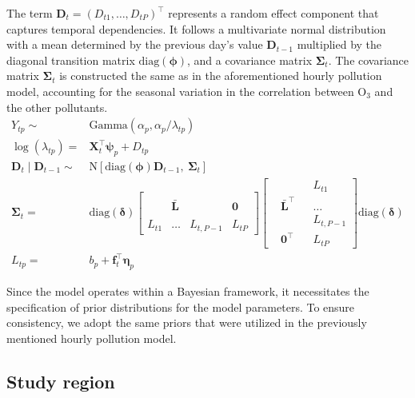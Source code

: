 \documentclass[
  12,
]{article}
\begin{document}
The term \(\symbf{D}_t=(D_{t1},\dots,D_{tP})^{\top}\) represents a
random effect component that captures temporal dependencies. It follows
a multivariate normal distribution with a mean determined by the
previous day's value \(\symbf{D}_{t-1}\) multiplied by the diagonal
transition matrix \(\text{diag}(\symbf{\phi})\), and a covariance matrix
\(\symbf{\Sigma}_t\). The covariance matrix \(\symbf{\Sigma}_t\) is
constructed the same as in the aforementioned hourly pollution model,
accounting for the seasonal variation in the correlation between O\(_3\)
and the other pollutants. \begin{equation}\label{eqnPollutiondaily}
\begin{aligned}
   Y_{tp} \sim & \mbox{Gamma}
   \left( \alpha_p, \alpha_p / \lambda_{tp} \right) \\
  \log{(\lambda_{tp})}  = & \symbf{X}_{t}^{\top}\symbf{\psi}_{p} + D_{tp} \\
    \symbf{D}_{t}  \mid \symbf{D}_{t-1}   \sim & \mbox{N}\left[\mbox{diag}(\symbf{\phi})  \symbf{D}_{t-1} ,\ \symbf{\Sigma}_t \right]\\
\symbf{\Sigma}_t  = &  \mbox{diag}(\symbf{\delta}) \left[
\begin{array}{cccc}
 &  &  &  \\
 & \symbf{\bar{L}}  &   &  {\symbf{0}}  \\ 
  &  &  &  \\
 L_{t1} & \dots & L_{t,P-1}  &  L_{tP}
\end{array}\right] \left[
\begin{array}{cccc}
 &  &  &  L_{t1} \\
 & \symbf{\bar{L}}^{\top}  &   &  \dots  \\ 
  &  &  & L_{t,P-1} \\
  & {\symbf{0}}^{\top} &   &  L_{tP}
\end{array}\right] \mbox{diag}(\symbf{\delta}) \\
L_{tp}  = &  b_p + \symbf{f}_t ^{\top}\symbf{\eta}_p
  \end{aligned}
\end{equation}

Since the model operates within a Bayesian framework, it necessitates
the specification of prior distributions for the model parameters. To
ensure consistency, we adopt the same priors that were utilized in the
previously mentioned hourly pollution model.

\hypertarget{study-region}{%
\subsection{Study region}\label{study-region}}
\end{document}
